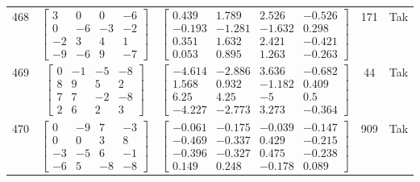 \documentclass[a4paper,12pt]{article}
\begin{document}
\begin{tabular}{c c c c c}
468
&
$\begin{bmatrix} 3 & 0 & 0 & -6 \\ 0 & -6 & -3 & -2 \\ -2 & 3 & 4 & 1 \\ -9 & -6 & 9 & -7 \end{bmatrix}$
&
$\begin{bmatrix} 0.439 & 1.789 & 2.526 & -0.526 \\ -0.193 & -1.281 & -1.632 & 0.298 \\ 0.351 & 1.632 & 2.421 & -0.421 \\ 0.053 & 0.895 & 1.263 & -0.263 \end{bmatrix}$
&
171
&
Tak
\\
469
&
$\begin{bmatrix} 0 & -1 & -5 & -8 \\ 8 & 9 & 5 & 2 \\ 7 & 7 & -2 & -8 \\ 2 & 6 & 2 & 3 \end{bmatrix}$
&
$\begin{bmatrix} -4.614 & -2.886 & 3.636 & -0.682 \\ 1.568 & 0.932 & -1.182 & 0.409 \\ 6.25 & 4.25 & -5 & 0.5 \\ -4.227 & -2.773 & 3.273 & -0.364 \end{bmatrix}$
&
44
&
Tak
\\
470
&
$\begin{bmatrix} 0 & -9 & 7 & -3 \\ 0 & 0 & 3 & 8 \\ -3 & -5 & 6 & -1 \\ -6 & 5 & -8 & -8 \end{bmatrix}$
&
$\begin{bmatrix} -0.061 & -0.175 & -0.039 & -0.147 \\ -0.469 & -0.337 & 0.429 & -0.215 \\ -0.396 & -0.327 & 0.475 & -0.238 \\ 0.149 & 0.248 & -0.178 & 0.089 \end{bmatrix}$
&
909
&
Tak
\\
\end{tabular} \egroup \newpage
\end{document}
